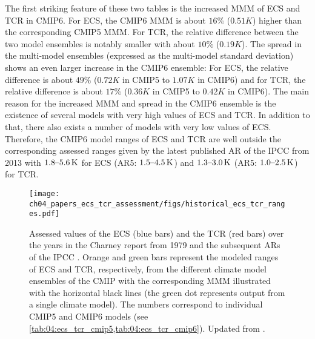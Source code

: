 The first striking feature of these two tables is the increased \ac{MMM} of
\ac{ECS} and \ac{TCR} in \acs{CMIP}6. For \ac{ECS}, the \acs{CMIP}6 \ac{MMM} is
about $16 \unit{\%}$ ($0.51 \unit{K}$) higher than the corresponding
\acs{CMIP}5 \ac{MMM}. For \ac{TCR}, the relative difference between the two
model ensembles is notably smaller with about $10 \unit{\%}$ ($0.19 \unit{K}$).
The spread in the multi-model ensembles (expressed as the multi-model standard
deviation) shows an even larger increase in the \acs{CMIP}6 ensemble: For
\ac{ECS}, the relative difference is about $49 \unit{\%}$ ($0.72 \unit{K}$ in
\acs{CMIP}5 to $1.07 \unit{K}$ in \acs{CMIP}6) and for \ac{TCR}, the relative
difference is about $17 \unit{\%}$ ($0.36 \unit{K}$ in \acs{CMIP}5 to $0.42
\unit{K}$ in \acs{CMIP}6). The main reason for the increased \ac{MMM} and
spread in the \acs{CMIP}6 ensemble is the existence of several models with very
high values of \ac{ECS} and \ac{TCR}. In addition to that, there also exists a
number of models with very low values of \ac{ECS}. Therefore, the \ac{CMIP}6
model ranges of \ac{ECS} and \ac{TCR} are well outside the corresponding
assessed ranges given by the latest published \ac{AR} of the \ac{IPCC} from
2013 \autocite{Stocker2013} with $\range{1.8}{5.6} \unit{K}$ for \ac{ECS}
(\acs{AR}5: $\range{1.5}{4.5} \unit{K}$) and  $\range{1.3}{3.0} \unit{K}$
(\acs{AR}5: $\range{1.0}{2.5} \unit{K}$) for \ac{TCR}.

\begin{figure}[t]
  \centering
  \texttt{[image: 
    ch04\_papers\_ecs\_tcr\_assessment/figs/historical\_ecs\_tcr\_ranges.pdf]}
  \caption{Assessed values of the \acf{ECS} (blue bars) and the \acf{TCR} (red
    bars) over the years in the Charney report from 1979 \autocite{Charney1979}
    and the subsequent \acfp{AR} of the \acf{IPCC} \autocite{Mitchell1990,
      Kattenberg1996, Albritton2001, Solomon2007, Stocker2013}. Orange and
    green bars represent the modeled ranges of \acs{ECS} and \acs{TCR},
    respectively, from the different climate model ensembles of the \acf{CMIP}
    with the corresponding \acf{MMM} illustrated with the horizontal black
    lines (the green dot represents output from a single climate model). The
    numbers correspond to individual \acs{CMIP}5 and \acs{CMIP}6 models (see
    \cref{tab:04:ecs_tcr_cmip5,tab:04:ecs_tcr_cmip6}). Updated from
    \textcite{Meehl2020}.}
  \label{fig:04:historical_ecs_tcr_ranges}
\end{figure}

